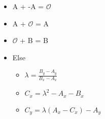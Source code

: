 \begin{itemize}
    \item[] A + -A = $\mathcal{O}$
    \item[] A + $\mathcal{O}$ = A
    \item[] $\mathcal{O}$ + B = B
    \item[] Else
    \begin{itemize}
        \item[] $\lambda = \frac{B_y - A_y} {B_x - A_x}$
        \item[] $C_x = \lambda^2 - A_x - B_x$
        \item[] $C_y = \lambda(A_x - C_x) - A_y$
    \end{itemize}
\end{itemize}

